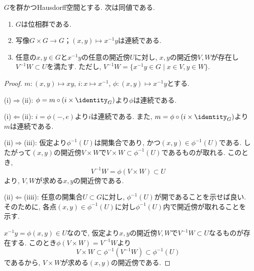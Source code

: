 
\begin{definition}[位相群]
    \label{topological_group}
    
\end{definition}

\begin{proposition}
    $G$を群かつHausdorff空間とする.
    次は同値である.
    \begin{enumerate}
        \item $G$は位相群である.
        \item 写像$G\times G \to G ； (x, y)\mapsto x^{-1}y$は連続である.
        \item 任意の$x,y\in G$と$x^{-1}y$の任意の開近傍$U$に対し,
        $x, y$の開近傍$V, W$が存在し$V^{-1}W\subset U$を満たす.
        ただし, $V^{-1}W= \{x^{-1}y\in G \mid x\in V, y\in W \}$.
    \end{enumerate}
\end{proposition}

\begin{proof}
    $m\colon (x,y)\mapsto xy$,
    $i\colon x\mapsto x^{-1}$,
    $\phi\colon (x,y)\mapsto x^{-1}y$とする.

    (i)$\Rightarrow$(ii):
    $\phi= m\circ (i\times \identity_G)$より$\phi$は連続である.

    (i)$\Leftarrow$(ii):
    $i = \phi(-,e)$より$i$は連続である.
    また, $m= \phi\circ(i\times\identity_G)$より$m$は連続である.

    (ii)$\Rightarrow$(iii):
    仮定より$\phi^{-1}(U)$は開集合であり, かつ$(x,y)\in \phi^{-1}(U)$である.
    したがって$(x, y)$の開近傍$V\times W$で$V\times W \subset \phi^{-1}(U)$であるものが取れる.
    このとき,
    \[V^{-1}W= \phi(V\times W) \subset U
    \]
    より, $V, W$が求める$x, y$の開近傍である.

    (ii)$\Leftarrow$(iiii):
    任意の開集合$U\subset G$に対し, $\phi^{-1}(U)$が開であることを示せば良い.
    そのために, 各点$(x,y)\in \phi^{-1}(U)$に対し$\phi^{-1}(U)$内で開近傍が取れることを示す.

    $x^{-1}y= \phi(x,y)\in U$なので, 仮定より$x, y$の開近傍$V, W$で$V^{-1}W\subset U$なるものが存在する.
    このとき$\phi(V\times W) = V^{-1}W$より
    \[V\times W \subset \phi^{-1}(V^{-1}W) \subset \phi^{-1}(U)
    \]
    であるから, $V\times W$が求める$(x,y)$の開近傍である.
\end{proof}

\begin{proposition}
    
\end{proposition}

